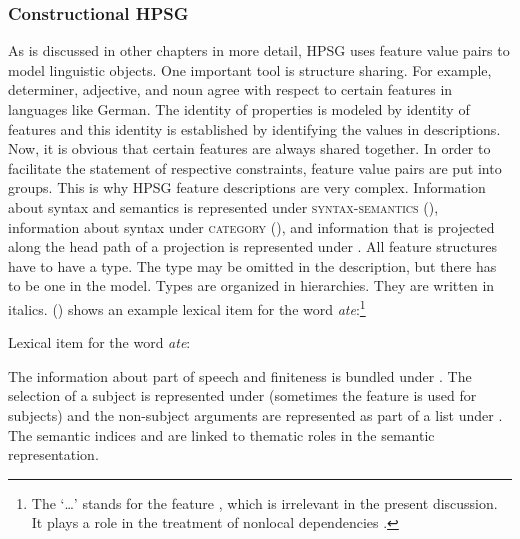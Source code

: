 \documentclass[output=paper
	        ,collection
	        ,collectionchapter
 	        ,biblatex
                ,babelshorthands
                ,newtxmath
                ,draftmode
                ,colorlinks, citecolor=brown
]{langscibook}
\begin{document}

\subsubsection{Constructional HPSG}
\label{sec-constructional-hpsg}

As is discussed in other chapters in more detail, HPSG uses feature value pairs to model linguistic
objects. One important tool is structure sharing. For example, determiner, adjective, and noun agree
with respect to certain features in languages like German. The identity of properties is modeled by
identity of features and this identity is established by identifying the values in descriptions. Now,
it is obvious that certain features are always shared together. In order to facilitate the statement
of respective constraints, feature value pairs are put into groups. This is why HPSG feature
descriptions are very complex. Information about syntax and semantics is represented under
\textsc{syntax-semantics} (\synsem), information about syntax under \textsc{category} (\cat), and
information that is projected along the head path of a projection is represented under \head. All
feature structures have to have a type. The type may be omitted in the description, but there has to
be one in the model. Types are organized in hierarchies. They are written in italics. ()
shows an example lexical item for the word \emph{ate}:\footnote{
  The `\ldots' stands for the feature \local, which is irrelevant in the present discussion. It plays
  a role in the treatment of nonlocal dependencies .
}

\eas
\label{le-ate}
Lexical item for the word \emph{ate}:\\

\zs
The information about part of speech and finiteness is bundled under \head. The selection of a
subject is represented under \spr (sometimes the feature \subj is used for subjects) and the
non-subject arguments are represented as part of a list under \comps. The semantic indices 
and  are linked to thematic roles in the semantic representation.
\end{document}
